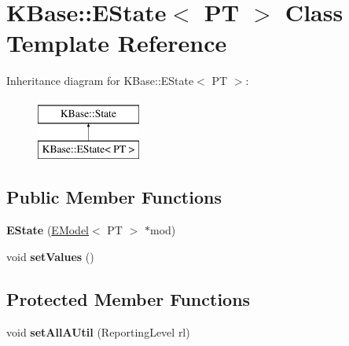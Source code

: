 \hypertarget{class_k_base_1_1_e_state}{\section{K\-Base\-:\-:E\-State$<$ P\-T $>$ Class Template Reference}
\label{class_k_base_1_1_e_state}
}
Inheritance diagram for K\-Base\-:\-:E\-State$<$ P\-T $>$\-:\begin{figure}[H]
\begin{center}
\leavevmode
\includegraphics[height=2.000000cm]{class_k_base_1_1_e_state}
\end{center}
\end{figure}
\subsection*{Public Member Functions}
\begin{DoxyCompactItemize}
\item 
\hypertarget{class_k_base_1_1_e_state_a9cd7e7f73e08e06b0bd3658ba7891c3f}{{\bfseries E\-State} (\hyperlink{class_k_base_1_1_e_model}{E\-Model}$<$ P\-T $>$ $\ast$mod)}\label{class_k_base_1_1_e_state_a9cd7e7f73e08e06b0bd3658ba7891c3f}

\item 
\hypertarget{class_k_base_1_1_e_state_aa00dab6c3b68754448e0866952c4e057}{void {\bfseries set\-Values} ()}\label{class_k_base_1_1_e_state_aa00dab6c3b68754448e0866952c4e057}

\end{DoxyCompactItemize}
\subsection*{Protected Member Functions}
\begin{DoxyCompactItemize}
\item 
\hypertarget{class_k_base_1_1_e_state_a419573f5f256e4979fa830af21121e3b}{void {\bfseries set\-All\-A\-Util} (Reporting\-Level rl)}\label{class_k_base_1_1_e_state_a419573f5f256e4979fa830af21121e3b}

\end{DoxyCompactItemize}
